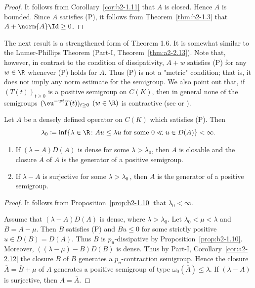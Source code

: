 \begin{proof}
It follows from Corollary~\ref{cor:b2-1.11} that $A$ is closed.
Hence $A$ is bounded.
Since $A$ satisfies (P), it follows from Theorem~\ref{thm:b2-1.3} that $A + \norm{A}\Id \geq 0$.
\end{proof}

The next result is a strengthened form of Theorem 1.6.
It is somewhat similar to the Lumer-Phillips Theorem (Part-I, Theorem~\ref{thm:a2-2.13}).
Note that, however, in contrast to the condition of dissipativity, $A + w$ satisfies (P) for any $w \in \R$ whenever (P) holds for $A$.
Thus (P) is not a "metric" condition; that is, it does not imply any norm estimate for the semigroup.
We also point out that, if\/ $(T(t))_{t \geq 0}$ is a positive semigroup on $C(K)$, then in general none of the semigroups $(\eu^{-wt}T(t))_{t \geq 0}$ $(w \in \R)$ is contractive (see \textcite{battydavies:1983} or \textcite{derndinger:1983}).

\begin{theorem}\label{thm:b2-1.13}
Let $A$ be a densely defined operator on $C(K)$ which satisfies (P).
Then
\[
    \lambda_{0} \coloneqq \inf\{\lambda \in \R \colon Au \leq \lambda u \text{ for some } 0 \ll u \in D(A)\} < \infty.
\]
\begin{enumerate}[\upshape (i)]
\item \label{thm:b2-1.13-1}
If\/ $(\lambda - A)D(A)$ is dense for some $\lambda > \lambda_{0}$, then $A$ is closable and the closure $\overline{A}$ of\/ $A$ is the generator of a positive semigroup.

\item \label{thm:b2-1.13-2}
If\/ $\lambda - A$ is surjective for some $\lambda > \lambda_{0}$\,, then $A$ is the generator of a positive semigroup.
\end{enumerate}
\end{theorem}

\begin{proof}
It follows from Proposition~\ref{prop:b2-1.10} that $\lambda_{0} < \infty$.

Assume that $(\lambda - A)D(A)$ is dense, where $\lambda > \lambda_{0}$.
Let $\lambda_{0} < \mu < \lambda$ and $B = A - \mu$.
Then $B$ satisfies (P) and $Bu \leq 0$ for some strictly positive $u \in D(B) = D(A)$.
Thus $B$ is $p_{u}$-dissipative by Proposition~\ref{prop:b2-1.10}.
Moreover, $((\lambda-\mu) - B)D(B)$ is dense.
Thus by Part-I, Corollary~\ref{cor:a2-2.12} 
the closure $\overline{B}$ of\/ $B$ generates a $p_{u}$-contraction semigroup.
Hence the
closure $\overline{A} = \overline{B} + \mu$ of\/ $A$ generates a positive semigroup of type $\omega_{0}(\overline{A}) \leq \lambda$.
If\/ $(\lambda - A)$ is surjective, then $A = \overline{A}$.
\end{proof}

